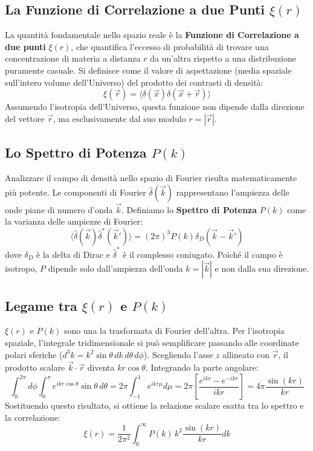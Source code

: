 \documentclass[11pt,a4paper]{report}
\begin{document}
\subsection{La Funzione di Correlazione a due Punti $\xi(r)$}
La quantità fondamentale nello spazio reale è la \textbf{Funzione di Correlazione a due punti} $\xi(r)$, che quantifica l'eccesso di probabilità di trovare una concentrazione di materia a distanza $r$ da un'altra rispetto a una distribuzione puramente casuale. Si definisce come il valore di aspettazione (media spaziale sull'intero volume dell'Universo) del prodotto dei contrasti di densità:
\begin{equation}
\xi(\vec{r}) = \langle \delta(\vec{x}) \delta(\vec{x} + \vec{r}) \rangle
\end{equation}
Assumendo l'isotropia dell'Universo, questa funzione non dipende dalla direzione del vettore $\vec{r}$, ma esclusivamente dal suo modulo $r = |\vec{r}|$.

\subsection{Lo Spettro di Potenza $P(k)$}
Analizzare il campo di densità nello spazio di Fourier risulta matematicamente più potente. Le componenti di Fourier $\hat{\delta}(\vec{k})$ rappresentano l'ampiezza delle onde piane di numero d'onda $\vec{k}$. 
Definiamo lo \textbf{Spettro di Potenza} $P(k)$ come la varianza delle ampiezze di Fourier:
\begin{equation}
\langle \hat{\delta}(\vec{k}) \hat{\delta}^*(\vec{k}') \rangle = (2\pi)^3 P(k) \delta_D(\vec{k} - \vec{k}')
\end{equation}
dove $\delta_D$ è la delta di Dirac e $\hat{\delta}^*$ è il complesso coniugato. Poiché il campo è isotropo, $P$ dipende solo dall'ampiezza dell'onda $k = |\vec{k}|$ e non dalla sua direzione.

\subsection{Legame tra $\xi(r)$ e $P(k)$}
$\xi(r)$ e $P(k)$ sono una la trasformata di Fourier dell'altra. Per l'isotropia spaziale, l'integrale tridimensionale si può semplificare passando alle coordinate polari sferiche ($d^3k = k^2 \sin\theta \, dk \, d\theta \, d\phi$). 
Scegliendo l'asse $z$ allineato con $\vec{r}$, il prodotto scalare $\vec{k} \cdot \vec{r}$ diventa $kr \cos\theta$. Integrando la parte angolare:
\begin{equation}
\int_0^{2\pi} d\phi \int_0^\pi e^{i kr \cos\theta} \sin\theta \, d\theta = 2\pi \int_{-1}^{1} e^{i kr \mu} d\mu = 2\pi \left[ \frac{e^{i kr} - e^{-i kr}}{i kr} \right] = 4\pi \frac{\sin(kr)}{kr}
\end{equation}
Sostituendo questo risultato, si ottiene la relazione scalare esatta tra lo spettro e la correlazione:
\begin{equation}
\xi(r) = \frac{1}{2\pi^2} \int_0^\infty P(k) \, k^2 \frac{\sin(kr)}{kr} dk
\end{equation}
\end{document}
